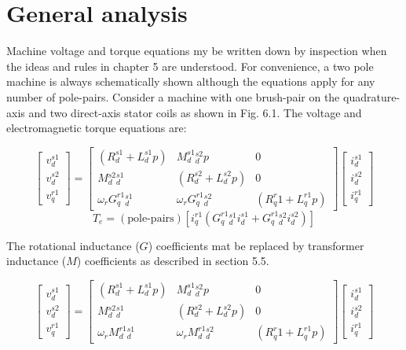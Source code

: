 \documentclass[a4paper,numbers=noenddot,12pt]{scrbook}
\begin{document}
\section{General analysis}
Machine voltage and torque equations my be written down by inspection when the ideas and rules in chapter 5 are understood. For convenience, a two pole machine is always schematically shown although the equations apply for any number of pole-pairs.
Consider a machine with one brush-pair on the quadrature-axis and two direct-axis stator coils as shown in Fig. 6.1. The voltage and electromagnetic torque equations are:

\begin{equation}
    \begin{bmatrix}
        v_d^{s1}\\[2ex] v_d^{s2}\\[2ex] v_q^{r1}
    \end{bmatrix} =
    \begin{bmatrix}
        (R_d^{s1} + L_d^{s1}p) & M_{d}^{s1}{}_{d}^{s2} p & 0 \\[2ex]
        M{_d^{s2}{}_d^{s1}} & (R_d^{s2} + L_d^{s2}p) & 0 \\[2ex]
        \omega_r G_{q}^{r1}{}_d^{s1} & \omega_r G_{q}^{r1}{}_d^{s2} & (R_q^r1{} + L_q^{r1}p)
    \end{bmatrix}
    \begin{bmatrix}
        i_d^{s1} \\[2ex] i_d^{s2} \\[2ex] i_q^{r1}
    \end{bmatrix}
    \label{}
\end{equation}
\begin{equation}
    T_e = (\text{pole-pairs})[i_q^{r1}(G_q^{r1}{}_d^{s1} i_d^{s1} + G_q^{r1}{}_d^{s2} i_d^{s2})]
    \label{}
\end{equation}

The rotational inductance ($G$) coefficients mat be replaced by transformer inductance ($M$) coefficients as described in section 5.5.

\begin{equation}
    \begin{bmatrix}
        v_d^{s1}\\[2ex] v_d^{s2}\\[2ex] v_q^{r1}
    \end{bmatrix} =
    \begin{bmatrix}
        (R_d^{s1} + L_d^{s1}p) & M_{d}^{s1}{}_{d}^{s2} p & 0 \\[2ex]
        M{_d^{s2}{}_d^{s1}} & (R_d^{s2} + L_d^{s2}p) & 0 \\[2ex]
        \omega_r M_{d}^{r1}{}_d^{s1} & \omega_r M_{d}^{r1}{}_d^{s2} & (R_q^r1{} + L_q^{r1}p)
    \end{bmatrix}
    \begin{bmatrix}
        i_d^{s1} \\[2ex] i_d^{s2} \\[2ex] i_q^{r1}
    \end{bmatrix}
    \label{}
\end{equation}
\end{document}

